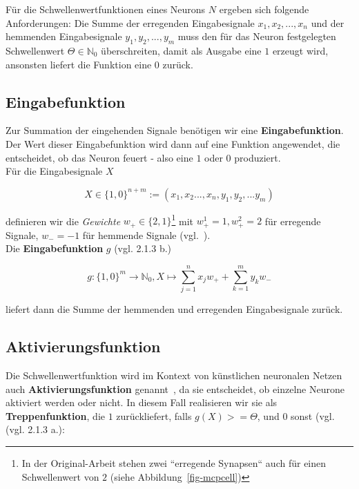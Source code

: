 Für die Schwellenwertfunktionen eines Neurons $N$ ergeben sich folgende Anforderungen: Die Summe der erregenden Eingabesignale $x_1, x_2, ..., x_n$ und der hemmenden Eingabesignale $y_1, y_2, ..., y_m$  muss den für das Neuron festgelegten Schwellenwert $\Theta \in  \mathbb{N}_0$ überschreiten, damit als Ausgabe eine $1$ erzeugt wird, ansonsten liefert die Funktion eine $0$ zurück.

\subsection*{Eingabefunktion}
Zur Summation der eingehenden Signale benötigen wir eine \textbf{Eingabefunktion}.
Der Wert dieser Eingabefunktion wird dann auf eine Funktion angewendet, die entscheidet, ob das Neuron feuert - also eine $1$ oder $0$ produziert.\\

\noindent
Für die Eingabesignale $X$

\begin{equation}
X \in \{1, 0\}^{n+m} := (x_1, x_2 ..., x_n, y_1, y_2, ... y_m)
\end{equation}\linebreak[2]

\noindent
definieren wir die \textit{Gewichte} $w_+ \in \{2, 1\}$\footnote{
    In der Original-Arbeit stehen zwei ``erregende Synapsen`` auch für einen Schwellenwert von $2$ (siehe Abbildung~\ref{fig-mcpcell})
} mit $w^1_+ =1, w^2_+ = 2$ für erregende Signale, $w_- = -1$ für hemmende Signale (vgl.~\cite[27-28]{Fau94}).\\


\noindent
Die \textbf{Eingabefunktion} $g$ (vgl. 2.1.3 b.)

\begin{equation}
g: \{1, 0\}^m \to  \mathbb{N}_0, X \mapsto \sum^n_{j=1} x_jw_+ + \sum^m_{k=1} y_kw_-
\label{eq:gl-mcpinpfunc}
\end{equation}\linebreak[2]

\noindent
liefert dann die Summe der hemmenden und erregenden Eingabesignale zurück.


\subsection*{Aktivierungsfunktion}
Die Schwellenwertfunktion wird im Kontext von künstlichen neuronalen Netzen auch \textbf{Aktivierungsfunktion} genannt~\cite[847]{RN09}, da sie entscheidet, ob einzelne Neurone aktiviert werden oder nicht. In diesem Fall realisieren wir sie als \textbf{Treppenfunktion}, die $1$ zurückliefert, falls $g(X) >= \Theta$, und $0$ sonst  (vgl. (vgl. 2.1.3 a.):

